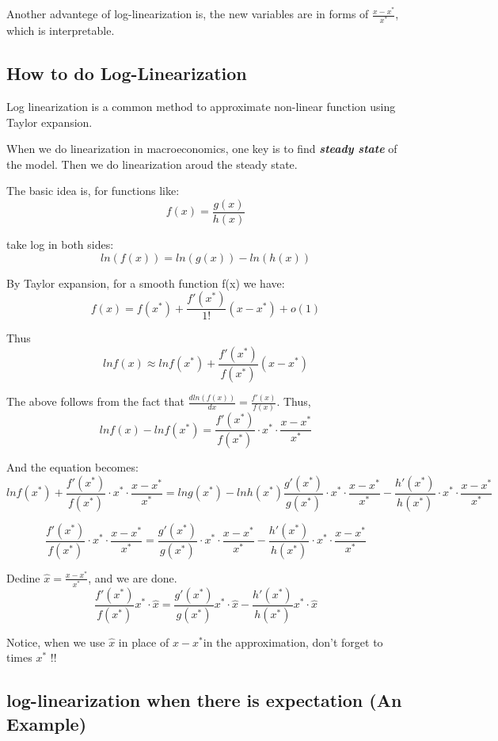\documentclass{book}
\theoremstyle{plain}
\theoremstyle{definition}
\begin{document}
Another advantege of log-linearization is,
the new variables are in forms of $\frac{x-x^*}{x^*}$,
which is interpretable.\\


\subsection{How to do Log-Linearization}

Log linearization is a common method to approximate non-linear function using Taylor expansion.

When we do linearization in macroeconomics, one key is to find \emph{\textbf{steady state}} of the model.
Then we do linearization aroud the steady state.

The basic idea is, for functions like:
\[f(x)=\frac{g(x)}{h(x)}\]

take log in both sides:
\[ln(f(x))=ln(g(x))-ln(h(x))\]

By Taylor expansion, for a smooth function f(x) we have:
\[f(x)=f(x^*)+\frac{f'(x^*)}{1!}(x-x^*)+o(1)\]

Thus 
\[lnf(x) \approx lnf(x^*)+\frac{f'(x^*)}{f(x^*)}(x-x^*)\]

The above follows from the fact that $\frac{dln(f(x))}{dx}=\frac{f'(x)}{f(x)}$. Thus,
\[lnf(x)-lnf(x^*)=\frac{f'(x^*)}{f(x^*)} \cdot x^* \cdot \frac{x-x^*}{x^*}\]

And the equation becomes:
\[lnf(x^*)+\frac{f'(x^*)}{f(x^*)} \cdot x^* \cdot \frac{x-x^*}{x^*}=lng(x^*)-lnh(x^*)
\frac{g'(x^*)}{g(x^*)} \cdot x^* \cdot \frac{x-x^*}{x^*}-
\frac{h'(x^*)}{h(x^*)} \cdot x^* \cdot \frac{x-x^*}{x^*}\]

\[\frac{f'(x^*)}{f(x^*)} \cdot x^* \cdot \frac{x-x^*}{x^*}=
\frac{g'(x^*)}{g(x^*)} \cdot x^* \cdot \frac{x-x^*}{x^*}-
\frac{h'(x^*)}{h(x^*)} \cdot x^* \cdot \frac{x-x^*}{x^*}\]

Dedine $\hat x=\frac{x-x^*}{x^*}$, and we are done.
\[\frac{f'(x^*)}{f(x^*)} x^* \cdot \hat x=
\frac{g'(x^*)}{g(x^*)} x^* \cdot \hat x-
\frac{h'(x^*)}{h(x^*)} x^* \cdot \hat x\]

Notice, when we use $\hat x$ in place of $x-x^*$in the approximation,
don't forget to times $x^*$ !!\\


\subsection{log-linearization when there is expectation (An Example)}
\end{document}
